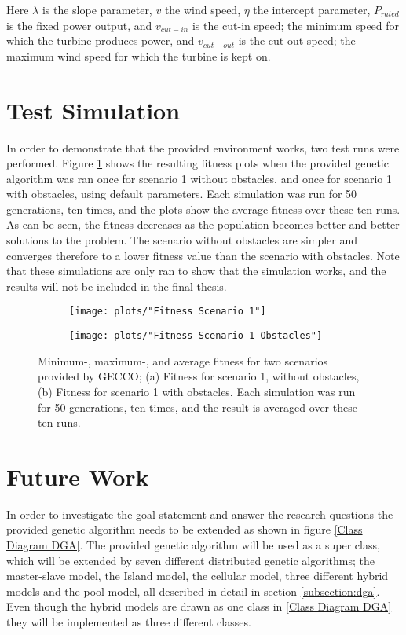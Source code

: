 \noindent Here $\lambda$ is the slope parameter, $v$ the wind speed, $\eta$ the intercept parameter, $P_{rated}$ is the fixed power output, and $v_{cut-in}$ is the cut-in speed; the minimum speed for which the turbine produces power, and $v_{cut-out}$ is the cut-out speed; the maximum wind speed for which the turbine is kept on. 


\section{Test Simulation}
In order to demonstrate that the provided environment works, two test runs were performed. Figure \ref{Test Plots} shows the resulting fitness plots when the provided genetic algorithm was ran once for scenario 1 without obstacles, and once for scenario 1 with obstacles, using default parameters. Each simulation was run for 50 generations, ten times, and the plots show the average fitness over these ten runs. As can be seen, the fitness decreases as the population becomes better and better solutions to the problem. The scenario without obstacles are simpler and converges therefore to a lower fitness value than the scenario with obstacles. Note that these simulations are only ran to show that the simulation works, and the results will not be included in the final thesis. 


\begin{figure}[h!]
    \centering
    \begin{subfigure}[b]{0.45\textwidth}
        \texttt{[image: plots/"Fitness Scenario 1"]}
        \caption{}
    \end{subfigure}
    \begin{subfigure}[b]{0.45\textwidth}
        \texttt{[image: plots/"Fitness Scenario 1 Obstacles"]}
        \caption{}
    \end{subfigure}
    \caption{Minimum-, maximum-, and average fitness for two scenarios provided by GECCO; (a) Fitness for scenario 1, without obstacles, (b) Fitness for scenario 1 with obstacles. Each simulation was run for 50 generations, ten times, and the result is averaged over these ten runs.}
    \label{Test Plots}
\end{figure}


\section{Future Work}
In order to investigate the goal statement and answer the research questions the provided genetic algorithm needs to be extended as shown in figure \ref{Class Diagram DGA}. The provided genetic algorithm will be used as a super class, which will be extended by seven different distributed genetic algorithms; the master-slave model, the Island model, the cellular model, three different hybrid models and the pool model, all described in detail in section \ref{subsection:dga}. Even though the hybrid models are drawn as one class in \ref{Class Diagram DGA} they will be implemented as three different classes. \\

